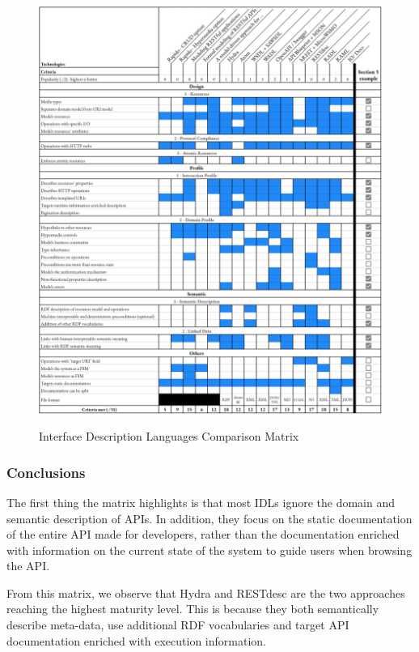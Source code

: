\begin{figure}[Ht]
\caption{Interface Description Languages Comparison Matrix}
\includegraphics[width=1\textwidth]{figures/IDL.png}
\label{idl-matrix}
\end{figure}

\subsubsection{Conclusions}

The first thing the matrix highlights is that most IDLs ignore the domain and semantic description of APIs. In addition, they focus on the static documentation of the entire API made for developers, rather than the documentation enriched with information on the current state of the system to guide users when browsing the API.

From this matrix, we observe that Hydra and RESTdesc are the two approaches reaching the highest maturity level. This is because they both semantically describe meta-data, use additional RDF vocabularies and target API documentation enriched with execution information.

